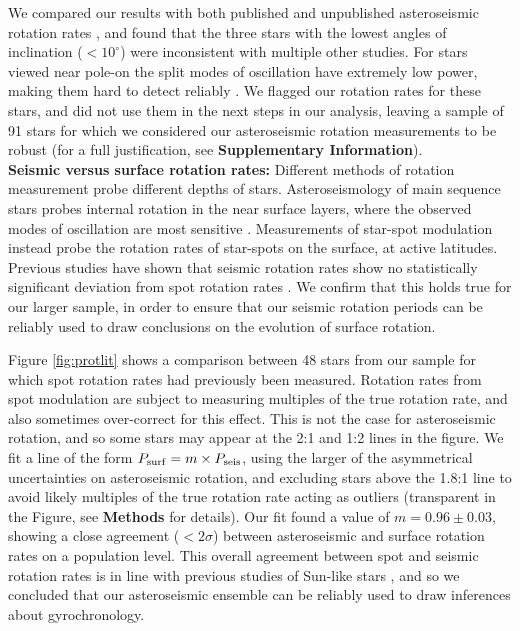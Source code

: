 \documentclass[12pt]{article}
\begin{document}
We compared our results with both published and unpublished asteroseismic rotation rates \cite{nielsen+2015,davies+2015,davies+2016, lund+2017, benomar+2018}, and found that the three stars with the lowest angles of inclination ($< 10^\circ$) were inconsistent with multiple other studies. For stars viewed near pole-on the split modes of oscillation have extremely low power, making them hard to detect reliably \cite{lund+2014}. We flagged our rotation rates for these stars, and did not use them in the next steps in our analysis, leaving a sample of 91 stars for which we considered our asteroseismic rotation measurements to be robust (for a full justification, see \textbf{Supplementary Information}).\\

\textbf{Seismic versus surface rotation rates:} Different methods of rotation measurement probe different depths of stars. Asteroseismology of main sequence stars probes internal rotation in the near surface layers, where the observed modes of oscillation are most sensitive \cite{lund+2014}. Measurements of star-spot modulation instead probe the rotation rates of star-spots on the surface, at active latitudes. Previous studies have shown that seismic rotation rates show no statistically significant deviation from spot rotation rates \cite{nielsen+2015, benomar+2015}. We confirm that this holds true for our larger sample, in order to ensure that our seismic rotation periods can be reliably used to draw conclusions on the evolution of surface rotation.

Figure \ref{fig:protlit} shows a comparison between 48 stars from our sample for which spot  rotation rates had previously been measured. Rotation rates from spot modulation are subject to measuring multiples of the true rotation rate, and also sometimes over-correct for this effect. This is not the case for asteroseismic rotation, and so some stars may appear at the 2:1 and 1:2 lines in the figure. We fit a line of the form $P_{\rm surf} = m \times P_{\rm seis}$, using the larger of the asymmetrical uncertainties on asteroseismic rotation, and excluding stars above the 1.8:1 line to avoid likely multiples of the true rotation rate acting as outliers (transparent in the Figure, see \textbf{Methods} for details). Our fit found a value of $m = 0.96 \pm 0.03$, showing a close agreement ($<2\sigma$) between asteroseismic and surface rotation rates on a population level. This overall agreement between spot and seismic rotation rates is in line with previous studies of Sun-like stars \cite{nielsen+2015, benomar+2015, gizon+2013, chaplin+2013}, and so we concluded that our asteroseismic ensemble can be reliably used to draw inferences about gyrochronology.\\
\end{document}
